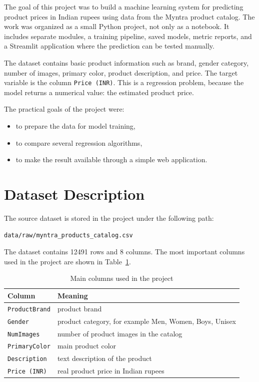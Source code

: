 \documentclass[12pt,a4paper]{article}
\begin{document}
The goal of this project was to build a machine learning system for predicting product prices in Indian rupees using data from the Myntra product catalog. The work was organized as a small Python project, not only as a notebook. It includes separate modules, a training pipeline, saved models, metric reports, and a Streamlit application where the prediction can be tested manually.

The dataset contains basic product information such as brand, gender category, number of images, primary color, product description, and price. The target variable is the column \texttt{Price (INR)}. This is a regression problem, because the model returns a numerical value: the estimated product price.

The practical goals of the project were:
\begin{itemize}
    \item to prepare the data for model training,
    \item to compare several regression algorithms,
    \item to make the result available through a simple web application.
\end{itemize}

\section{Dataset Description}

The source dataset is stored in the project under the following path:

\begin{lstlisting}[language=bash, caption={Dataset location}]
data/raw/myntra_products_catalog.csv
\end{lstlisting}

The dataset contains 12491 rows and 8 columns. The most important columns used in the project are shown in Table~\ref{tab:data}.

\begin{table}[H]
\centering
\begin{tabular}{|p{4cm}|p{9cm}|}
\hline
\textbf{Column} & \textbf{Meaning} \\ \hline
\texttt{ProductBrand} & product brand \\ \hline
\texttt{Gender} & product category, for example Men, Women, Boys, Unisex \\ \hline
\texttt{NumImages} & number of product images in the catalog \\ \hline
\texttt{PrimaryColor} & main product color \\ \hline
\texttt{Description} & text description of the product \\ \hline
\texttt{Price (INR)} & real product price in Indian rupees \\ \hline
\end{tabular}
\caption{Main columns used in the project}
\label{tab:data}
\end{table}
\end{document}
